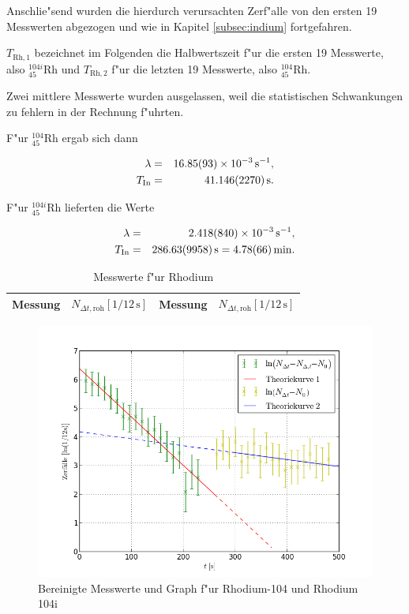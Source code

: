 		Anschlie"send wurden die hierdurch verursachten Zerf"alle von den ersten 19 Messwerten abgezogen und wie in Kapitel \ref{subsec:indium} fortgefahren.

		$T_{\mathrm{Rh}, 1}$ bezeichnet im Folgenden die Halbwertszeit f"ur die ersten 19 Messwerte, also ${}_{45}^{104i}\mathrm{Rh}$ und $T_{\mathrm{Rh}, 2}$ f"ur die letzten 19 Messwerte, also ${}_{45}^{104}\mathrm{Rh}$.

		Zwei mittlere Messwerte wurden ausgelassen, weil die statistischen Schwankungen zu fehlern in der Rechnung f"uhrten.


		F"ur ${}_{45}^{104}\mathrm{Rh}$ ergab sich dann

		\begin{eqnarray}
			\lambda & = & \SI{16.85 (93)e-3}{\per \second} , \\
			T_\mathrm{In} & = & \SI{41.146 (2270)}{\second} .
		\end{eqnarray}

		F"ur ${}_{45}^{104i}\mathrm{Rh}$ lieferten die Werte

		\begin{eqnarray}
			\lambda & = & \SI{2.418 (840)e-3}{\per \second} , \\
			T_\mathrm{In} & = & \SI{286.63 (9958)}{\second} = \SI{4.78 (66)}{\minute} .
		\end{eqnarray}

		\begin{table}
			\begin{center}
				\caption{Messwerte f"ur Rhodium}
				\label{tabelle:rhodium}
				\begin{tabular}{|c|c||c|c|}
					\hline 
					Messung & $N_{\Delta t, \mathrm{roh}}[1 / 12\,\mathrm{s}]$ & Messung & $N_{\Delta t, \mathrm{roh}}[1 / 12\,\mathrm{s}]$\\
					\hline 
					
					\hline 
				\end{tabular}
			\end{center}
		\end{table}

		\begin{figure}[h]
			\centering
			\includegraphics[width = 15cm]{img/graph_rhodium_linearisiert.png}
			\caption{Bereinigte Messwerte und Graph f"ur Rhodium-104 und Rhodium 104i}
			\label{fig:the_label}
		\end{figure}
